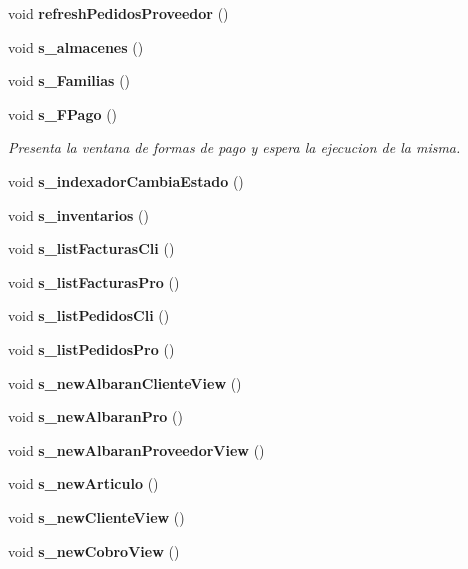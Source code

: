 \begin{CompactItemize}
\item 
void {\bf refresh\-Pedidos\-Proveedor} ()\label{classcompany_a36}

\item 
void {\bf s\_\-almacenes} ()\label{classcompany_a37}

\item 
void {\bf s\_\-Familias} ()\label{classcompany_a38}

\item 
void {\bf s\_\-FPago} ()\label{classcompany_a39}

\begin{CompactList}\small\item\em Presenta la ventana de formas de pago y espera la ejecucion de la misma. \item\end{CompactList}\item 
void {\bf s\_\-indexador\-Cambia\-Estado} ()\label{classcompany_a40}

\item 
void {\bf s\_\-inventarios} ()\label{classcompany_a41}

\item 
void {\bf s\_\-list\-Facturas\-Cli} ()\label{classcompany_a42}

\item 
void {\bf s\_\-list\-Facturas\-Pro} ()\label{classcompany_a43}

\item 
void {\bf s\_\-list\-Pedidos\-Cli} ()\label{classcompany_a44}

\item 
void {\bf s\_\-list\-Pedidos\-Pro} ()\label{classcompany_a45}

\item 
void {\bf s\_\-new\-Albaran\-Cliente\-View} ()\label{classcompany_a46}

\item 
void {\bf s\_\-new\-Albaran\-Pro} ()\label{classcompany_a47}

\item 
void {\bf s\_\-new\-Albaran\-Proveedor\-View} ()\label{classcompany_a48}

\item 
void {\bf s\_\-new\-Articulo} ()\label{classcompany_a49}

\item 
void {\bf s\_\-new\-Cliente\-View} ()\label{classcompany_a50}

\item 
void {\bf s\_\-new\-Cobro\-View} ()\label{classcompany_a51}


\end{CompactItemize}
